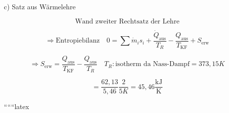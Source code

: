 c) Satz aus Wärmelehre

\[
\text{Wand zweiter Rechtsatz der Lehre}
\]

\[
\Rightarrow \text{Entropiebilanz} \quad 0 = \sum \dot{m}_i s_i + \frac{\dot{Q}_{\text{aus}}}{T_R} - \frac{Q_{\text{aus}}}{T_{\text{KF}}} + S_{\text{erw}}
\]

\[
\Rightarrow S_{\text{erw}} = \frac{Q_{\text{aus}}}{T_{\text{KF}}} - \frac{Q_{\text{aus}}}{T_R} \quad T_R: \text{isotherm da Nass-Dampf} = 373,15 K
\]

\[
= \frac{62,13}{5,46} \frac{2}{5 K} = 45,46 \frac{\text{kJ}}{\text{K}}
\]

``````latex
